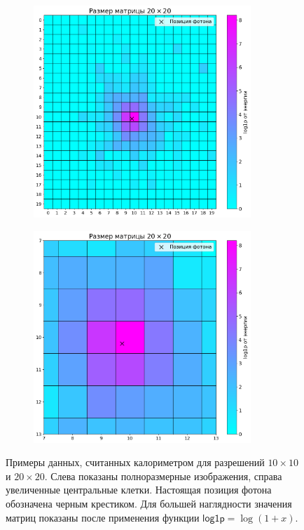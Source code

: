 \documentclass[a4paper,12pt]{extarticle}
\begin{document}
\begin{figure}[t]
    \begin{subfigure}{0.5\textwidth}
        \centering
        \includegraphics[width=0.9\textwidth]{graphics/data_20x20.png}
    \end{subfigure}%
    \begin{subfigure}{0.5\textwidth}
        \centering
        \includegraphics[width=0.9\textwidth]{graphics/data_20x20_zoomed.png}
    \end{subfigure}
    \caption{Примеры данных, считанных калориметром для разрешений $10 \times 10$ и $20 \times 20$. Слева показаны полноразмерные изображения, справа увеличенные центральные клетки. Настоящая позиция фотона обозначена черным крестиком. Для большей наглядности значения матриц показаны после применения функции $\mathsf{log1p} = \log(1 + x)$.}
    \label{image:data_sample}
\end{figure}
\end{document}

